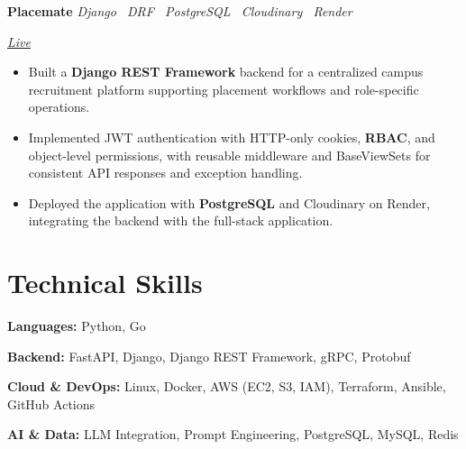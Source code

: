 \documentclass[10pt,a4paper]{article}
\newcommand{\projectentry}[3]{%
    \noindent
    \begin{minipage}[t]{0.62\linewidth}
        \raggedright
        \textbf{#1}
        \hspace{0.7em}
        \textit{\color{textgray}#2}
    \end{minipage}%
    \hfill
    \begin{minipage}[t]{0.34\linewidth}
        \raggedleft
        \itshape\color{textgray}#3
    \end{minipage}%
    \par
}
\begin{document}
\vspace{3pt}

\projectentry
    {Placemate}
    {Django \textperiodcentered\ DRF \textperiodcentered\ PostgreSQL \textperiodcentered\ Cloudinary \textperiodcentered\ Render}
    {\href{https://placemate-coral.vercel.app/}{Live}}

\vspace{2pt}

\begin{itemize}
    \item Built a \textbf{Django REST Framework} backend for a centralized campus recruitment platform supporting placement workflows and role-specific operations.

    \item Implemented JWT authentication with HTTP-only cookies, \textbf{RBAC}, and object-level permissions, with reusable middleware and BaseViewSets for consistent API responses and exception handling.

    \item Deployed the application with \textbf{PostgreSQL} and Cloudinary on Render, integrating the backend with the full-stack application.
\end{itemize}

\section*{Technical Skills}

{\fontsize{10}{12}\selectfont

\textbf{Languages:} Python, Go
\par\vspace{2pt}

\textbf{Backend:} FastAPI, Django, Django REST Framework, gRPC, Protobuf
\par\vspace{2pt}

\textbf{Cloud \& DevOps:} Linux, Docker, AWS (EC2, S3, IAM), Terraform, Ansible, GitHub Actions
\par\vspace{2pt}

\textbf{AI \& Data:} LLM Integration, Prompt Engineering, PostgreSQL, MySQL, Redis
\par\vspace{2pt}
}
\end{document}

